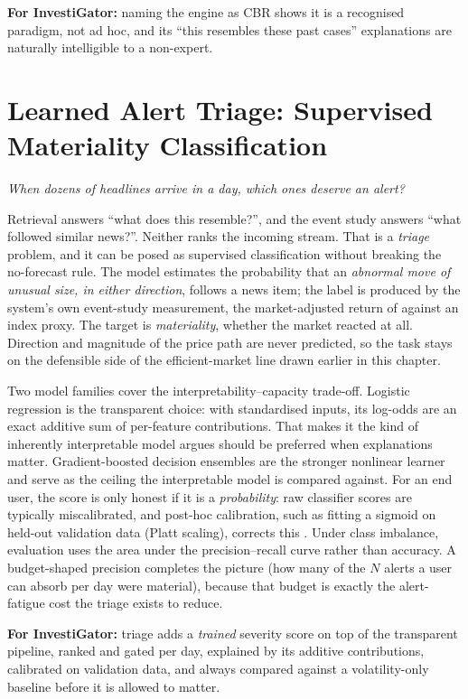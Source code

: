 \textbf{For InvestiGator:} naming the engine as CBR shows it is a recognised paradigm, not ad hoc, and its
``this resembles these past cases'' explanations are naturally intelligible to a non-expert.

\section{Learned Alert Triage: Supervised Materiality Classification}
\label{sec:sota_triage}

\emph{When dozens of headlines arrive in a day, which ones deserve an alert?}

Retrieval answers ``what does this resemble?'', and the event study answers ``what followed similar
news?''. Neither ranks the incoming stream. That is a \emph{triage} problem, and it can be posed as
supervised classification without breaking the no-forecast rule. The model estimates the probability
that an \emph{abnormal move of unusual size, in either direction}, follows a news item; the label is
produced by the system's own event-study measurement, the market-adjusted return of
\textcite{brown1985daily} against an index proxy. The target is \emph{materiality}, whether the market
reacted at all. Direction and magnitude of the price path are never predicted, so the task stays on
the defensible side of the efficient-market line drawn earlier in this chapter.

Two model families cover the interpretability--capacity trade-off. Logistic regression is the
transparent choice: with standardised inputs, its log-odds are an exact additive sum of per-feature
contributions. That makes it the kind of inherently interpretable model
\textcite{rudin2019stop} argues should be preferred when explanations matter. Gradient-boosted decision
ensembles \autocite{friedman2001gbm} are the stronger nonlinear learner and serve as the ceiling the
interpretable model is compared against. For an end user, the score is only honest if it is a
\emph{probability}: raw classifier scores are typically miscalibrated, and post-hoc calibration, such as
fitting a sigmoid on held-out validation data (Platt scaling), corrects this
\autocite{niculescu2005calibration}. Under class imbalance, evaluation uses the area under the
precision--recall curve rather than accuracy. A budget-shaped precision completes the picture (how
many of the $N$ alerts a user can absorb per day were material), because that budget is exactly the
alert-fatigue cost the triage exists to reduce.

\textbf{For InvestiGator:} triage adds a \emph{trained} severity score on top of the transparent pipeline,
ranked and gated per day, explained by its additive contributions, calibrated on validation data, and
always compared against a volatility-only baseline before it is allowed to matter.

